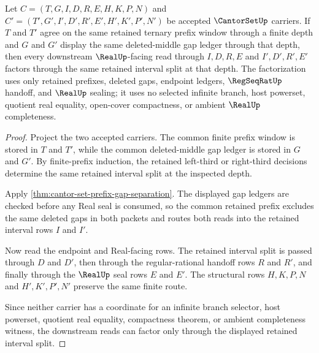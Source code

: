 \begin{theorem}
\label{thm:cantor-set-triadic-window-split-stability}
Let $C=(T,G,I,D,R,E,H,K,P,N)$ and $C'=(T',G',I',D',R',E',H',K',P',N')$ be accepted $\CantorSetUp$ carriers. If $T$ and $T'$ agree on the same retained ternary prefix window through a finite depth and $G$ and $G'$ display the same deleted-middle gap ledger through that depth, then every downstream $\RealUp$-facing read through $I,D,R,E$ and $I',D',R',E'$ factors through the same retained interval split at that depth. The factorization uses only retained prefixes, deleted gaps, endpoint ledgers, $\RegSeqRatUp$ handoff, and $\RealUp$ sealing; it uses no selected infinite branch, host powerset, quotient real equality, open-cover compactness, or ambient $\RealUp$ completeness.
\end{theorem}
\begin{proof}
Project the two accepted carriers. The common finite prefix window is stored in $T$ and $T'$, while the common deleted-middle gap ledger is stored in $G$ and $G'$. By finite-prefix induction, the retained left-third or right-third decisions determine the same retained interval split at the inspected depth.

Apply \autoref{thm:cantor-set-prefix-gap-separation}. The displayed gap ledgers are checked before any Real seal is consumed, so the common retained prefix excludes the same deleted gaps in both packets and routes both reads into the retained interval rows $I$ and $I'$.

Now read the endpoint and Real-facing rows. The retained interval split is passed through $D$ and $D'$, then through the regular-rational handoff rows $R$ and $R'$, and finally through the $\RealUp$ seal rows $E$ and $E'$. The structural rows $H,K,P,N$ and $H',K',P',N'$ preserve the same finite route.

Since neither carrier has a coordinate for an infinite branch selector, host powerset, quotient real equality, compactness theorem, or ambient completeness witness, the downstream reads can factor only through the displayed retained interval split.
\end{proof}

